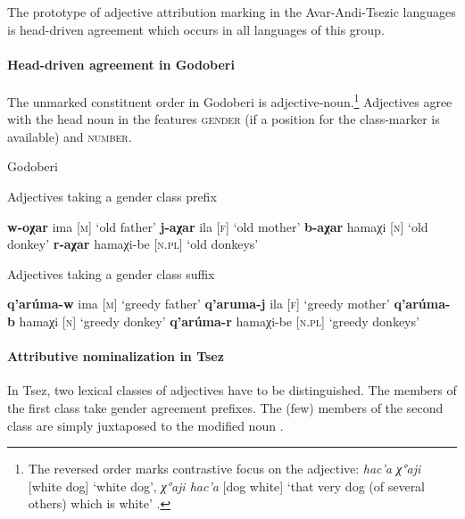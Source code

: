 The prototype of adjective attribution marking in the Avar-Andi-Tsezic languages is head-driven agreement which occurs in all languages of this group.

\paragraph{Head-driven agreement in Godoberi}
The unmarked constituent order in Godoberi is adjective-noun.\footnote{The reversed order marks contrastive focus on the adjective: \textit{hac'a χ°aji} [white dog] ‘white dog’, \textit{χ°aji hac'a} [dog white] ‘that very dog (of several others) which is white’ \citep[149]{kazenin1996a}.} Adjectives agree with the head noun in the features \textsc{gender} (if a position for the class-marker is available) and \textsc{number}.
\begin{exe}
\ex 
\rm{Godoberi \citep[25]{tatevosov1996a}}
\begin{xlist}
\ex 
\rm{Adjectives taking a gender class prefix}
\begin{xlist}
\ex \textbf{w-oχar} ima 			\rm{[\textsc{m}] ‘old father’}
\ex \textbf{j-aχar} ila			\rm{[\textsc{f}] ‘old mother’}
\ex \textbf{b-aχar} hamaχi		\rm{[\textsc{n}] ‘old donkey’}
\ex \textbf{r-aχar} hamaχi-be 		\rm{[\textsc{n.pl}] ‘old donkeys’}
\end{xlist}

\ex 
\rm{Adjectives taking a gender class suffix}
\begin{xlist}
\ex \textbf{q'arúma-w} ima		\rm{[\textsc{m}] ‘greedy father’}
\ex \textbf{q'aruma-j} ila			\rm{[\textsc{f}] ‘greedy mother’}
\ex \textbf{q'arúma-b} hamaχi 	\rm{[\textsc{n}] ‘greedy donkey’}
\ex \textbf{q'arúma-r} hamaχi-be 	\rm{[\textsc{n.pl}] ‘greedy donkeys’}
\end{xlist}
\end{xlist}
\end{exe}

\paragraph{Attributive nominalization in Tsez}
In Tsez, two lexical classes of adjectives have to be distinguished. The members of the first class take gender agreement prefixes. The (few) members of the second class are simply juxtaposed to the modified noun \cite[126]{alekseev-etal2004}.


